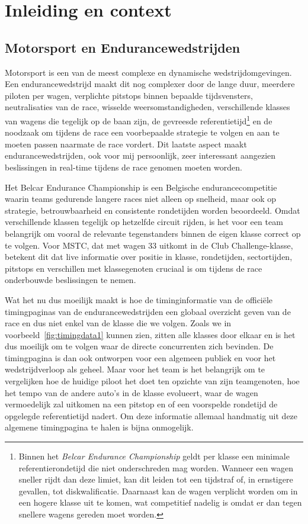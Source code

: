 
\chapter{Inleiding en context}
\label{chap:context}

\section{Motorsport en Endurancewedstrijden}
Motorsport is een van de meest complexe en dynamische wedstrijdomgevingen. Een endurancewedstrijd maakt dit nog complexer door de lange duur, meerdere piloten per wagen, verplichte pitstops binnen bepaalde tijdsvensters, neutralisaties van de race, wisselde weersomstandigheden, verschillende klasses van wagens die tegelijk op de baan zijn, de gevreesde referentietijd\footnote{Binnen het \emph{Belcar Endurance Championship} geldt per klasse een minimale referentierondetijd die niet onderschreden mag worden. Wanneer een wagen sneller rijdt dan deze limiet, kan dit leiden tot een tijdstraf of, in ernstigere gevallen, tot diskwalificatie. Daarnaast kan de wagen verplicht worden om in een hogere klasse uit te komen, wat competitief nadelig is omdat er dan tegen snellere wagens gereden moet worden.} en de noodzaak om tijdens de race een voorbepaalde strategie te volgen en aan te moeten passen naarmate de race vordert. Dit laatste aspect maakt endurancewedstrijden, ook voor mij persoonlijk, zeer interessant aangezien beslissingen in real-time tijdens de race genomen moeten worden.

Het Belcar Endurance Championship is een Belgische endurancecompetitie waarin teams gedurende langere races niet alleen op snelheid, maar ook op strategie, betrouwbaarheid en consistente rondetijden worden beoordeeld. Omdat verschillende klassen tegelijk op hetzelfde circuit rijden, is het voor een team belangrijk om vooral de relevante tegenstanders binnen de eigen klasse correct op te volgen. Voor MSTC, dat met wagen 33 uitkomt in de Club Challenge-klasse, betekent dit dat live informatie over positie in klasse, rondetijden, sectortijden, pitstops en verschillen met klassegenoten cruciaal is om tijdens de race onderbouwde beslissingen te nemen.

Wat het nu dus moeilijk maakt is hoe de timinginformatie van de officiële timingpaginas van de endurancewedstrijden een globaal overzicht geven van de race en dus niet enkel van de klasse die we volgen. Zoals we in voorbeeld~\ref{fig:timingdata1} kunnen zien, zitten alle klasses door elkaar en is het dus moeilijk om te volgen waar de directe concurrenten zich bevinden. De timingpagina is dan ook ontworpen voor een algemeen publiek en voor het wedstrijdverloop als geheel. Maar voor het team is het belangrijk om te vergelijken hoe de huidige piloot het doet ten opzichte van zijn teamgenoten, hoe het tempo van de andere auto's in de klasse evolueert, waar de wagen vermoedelijk zal uitkomen na een pitstop en of een voorspelde rondetijd de opgelegde referentietijd nadert. Om deze informatie allemaal handmatig uit deze algemene timingpagina te halen is bijna onmogelijk.


